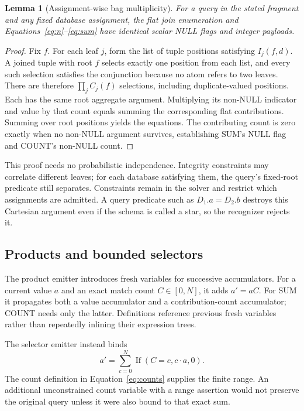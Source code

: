 \documentclass[3p,times,authoryear]{elsarticle}
\newtheorem{lemma}{Lemma}
\newcommand{\ite}{\operatorname{If}}
\begin{document}
\begin{lemma}[Assignment-wise bag multiplicity]
For a query in the stated fragment and any fixed database assignment, the flat join enumeration and Equations~\eqref{eq:n}--\eqref{eq:sum} have identical scalar NULL flags and integer payloads.
\end{lemma}
\begin{proof}
Fix $f$. For each leaf $j$, form the list of tuple positions satisfying $I_j(f,d)$. A joined tuple with root $f$ selects exactly one position from each list, and every such selection satisfies the conjunction because no atom refers to two leaves. There are therefore $\prod_j C_j(f)$ selections, including duplicate-valued positions. Each has the same root aggregate argument. Multiplying its non-NULL indicator and value by that count equals summing the corresponding flat contributions. Summing over root positions yields the equations. The contributing count is zero exactly when no non-NULL argument survives, establishing SUM's NULL flag and COUNT's non-NULL count.
\end{proof}

This proof needs no probabilistic independence. Integrity constraints may correlate different leaves; for each database satisfying them, the query's fixed-root predicate still separates. Constraints remain in the solver and restrict which assignments are admitted. A query predicate such as $D_1.a=D_2.b$ destroys this Cartesian argument even if the schema is called a star, so the recognizer rejects it.

\subsection{Products and bounded selectors}
The product emitter introduces fresh variables for successive accumulators. For a current value $a$ and an exact match count $C\in[0,N]$, it adds $a'=aC$. For SUM it propagates both a value accumulator and a contribution-count accumulator; COUNT needs only the latter. Definitions reference previous fresh variables rather than repeatedly inlining their expression trees.

The selector emitter instead binds
\begin{equation}
 a'=\sum_{c=0}^{N}\ite(C=c,c\cdot a,0).
 \label{eq:selector}
\end{equation}
The count definition in Equation~\eqref{eq:counts} supplies the finite range. An additional unconstrained count variable with a range assertion would not preserve the original query unless it were also bound to that exact sum.
\end{document}
